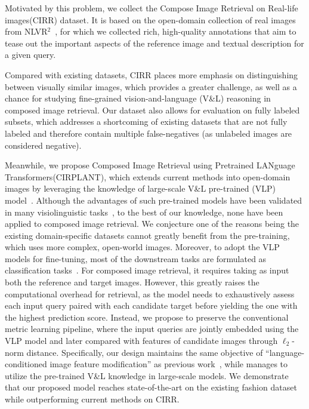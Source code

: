 \documentclass[10pt,twocolumn,letterpaper]{article}
\newcommand{\dstname}{CIRR\xspace}
\newcommand{\dstnamefull}{Compose Image Retrieval on Real-life images\xspace}
\newcommand{\modelnamefull}{Composed Image Retrieval using Pretrained LANguage Transformers\xspace}
\newcommand{\modelname}{CIRPLANT\xspace}
\begin{document}
Motivated by this problem, we collect the \dstnamefull (\dstname) dataset. It is based on the open-domain collection of real images from NLVR$^2$~\cite{Suhr_2019_nlvr2}, for which we collected rich, high-quality annotations that aim to tease out the important aspects of the reference image and textual description for a given query.

Compared with existing datasets, \dstname places more emphasis on distinguishing between visually similar images, which provides a greater challenge, as well as a chance for studying fine-grained vision-and-language (V\&L) reasoning in composed image retrieval. 
Our dataset also allows for evaluation on fully labeled subsets, which addresses a shortcoming of existing datasets that are not fully labeled and therefore contain multiple false-negatives (as unlabeled images are considered negative).

Meanwhile, we propose \modelnamefull (\modelname), which extends current methods into open-domain images by leveraging the knowledge of large-scale V\&L pre-trained (VLP) model~\cite{oscar}. 
Although the advantages of such pre-trained models have been validated in many visiolinguistic tasks~\cite{oscar,vilbert,chen2020uniter}, to the best of our knowledge, none have been applied to composed image retrieval. We conjecture one of the reasons being the existing domain-specific datasets cannot greatly benefit from the pre-training, which uses more complex, open-world images. 
Moreover, to adopt the VLP models for fine-tuning, most of the downstream tasks are formulated as classification tasks~\cite{oscar,chen2020uniter}. For composed image retrieval, it requires taking as input both the reference and target images. However, this greatly raises the computational overhead for retrieval, as the model needs to exhaustively assess each input query paired with each candidate target before yielding the one with the highest prediction score. 
Instead, we propose to preserve the conventional metric learning pipeline, where the input queries are jointly embedded using the VLP model and later compared with features of candidate images through $\ell_2$-norm distance. 
Specifically, our design maintains the same objective of ``language-conditioned image feature modification'' as previous work~\cite{Vo_2019_tirg,chen2020image_val,dodds2020modality_maaf}, while manages to utilize the pre-trained V\&L knowledge in large-scale models.
We demonstrate that our proposed model reaches state-of-the-art on the existing fashion dataset while outperforming current methods on \dstname.
\end{document}
